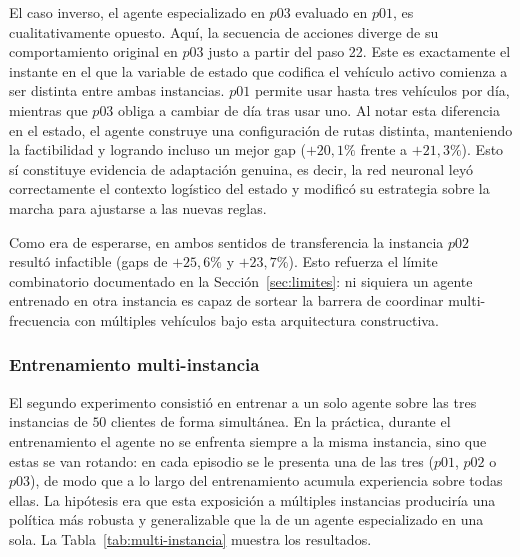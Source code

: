 El caso inverso, el agente especializado en $p03$ evaluado en $p01$, es cualitativamente opuesto. Aquí, la secuencia de acciones diverge de su comportamiento original en $p03$ justo a partir del paso 22. Este es exactamente el instante en el que la variable de estado que codifica el vehículo activo comienza a ser distinta entre ambas instancias. $p01$ permite usar hasta tres vehículos por día, mientras que $p03$ obliga a cambiar de día tras usar uno. Al notar esta diferencia en el estado, el agente construye una configuración de rutas distinta, manteniendo la factibilidad y logrando incluso un mejor gap ($+20{,}1\%$ frente a $+21{,}3\%$). Esto sí constituye evidencia de adaptación genuina, es decir, la red neuronal leyó correctamente el contexto logístico del estado y modificó su estrategia sobre la marcha para ajustarse a las nuevas reglas.

Como era de esperarse, en ambos sentidos de transferencia la instancia $p02$ resultó infactible (gaps de $+25{,}6\%$ y $+23{,}7\%$). Esto refuerza el límite combinatorio documentado en la Sección~\ref{sec:limites}: ni siquiera un agente entrenado en otra instancia es capaz de sortear la barrera de coordinar multi-frecuencia con múltiples vehículos bajo esta arquitectura constructiva.

\subsubsection{Entrenamiento multi-instancia}
El segundo experimento consistió en entrenar a un solo agente sobre las tres instancias de $50$ clientes de forma simultánea. En la práctica, durante el entrenamiento el agente no se enfrenta siempre a la misma instancia, sino que estas se van rotando: en cada episodio se le presenta una de las tres ($p01$, $p02$ o $p03$), de modo que a lo largo del entrenamiento acumula experiencia sobre todas ellas. La hipótesis era que esta exposición a múltiples instancias produciría una política más robusta y generalizable que la de un agente especializado en una sola. La Tabla~\ref{tab:multi-instancia} muestra los resultados.  

